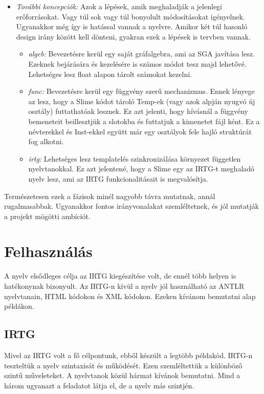 {\begin{itemize}
\item \emph{További koncepciók:}
Azok a lépések, amik meghaladják a jelenlegi erőforrásokat.
Vagy túl sok vagy túl bonyolult módosításokat igényelnek.
Ugyanakkor még így is hatással vannak a nyelvre.
Amikor két túl hasonló design irány között kell dönteni, gyakran ezek a lépések is tervben vannak.
\begin{itemize}
\item \emph{algeb:}
Bevezetésre kerül egy saját gráfalgebra, ami az SGA javítása lesz.
Ezeknek bejárására és kezelésére is számos módot tesz majd lehetővé.
Lehetséges lesz float alapon tárolt számokat kezelni.
\item \emph{func:}
Bevezetésre kerül egy függvény szerű mechanizmus.
Ennek lényege az lesz, hogy a Slime kódot tároló Temp-ek (vagy azok alpján nyugvó új osztály) futtathatóak lesznek.
Ez azt jelenti, hogy hívásnál a függvény bemeneteit beillesztjük a slotokba és futtatjuk a kimenetet fájl ként.
Ez a névterekkel és Inst-ekkel együtt már egy osztályok fele hajló struktúrát fog alkotni.
\item \emph{irtg:}
Lehetséges lesz templatelés szinkronizálása környezet független nyelvtanokkal.
Ez azt jelentené, hogy a Slime egy az IRTG-t meghaladó nyelv lesz, ami az IRTG funkcionalitásait is megvalósítja.
\end{itemize}

\end{itemize}

Természetesen ezek a fázisok minél nagyobb távra mutatnak, annál rugalmasabbak.
Ugyanakkor fontos irányvonalakat szemléltetnek, és jól mutatják a projekt mögötti ambíciót.



\section{Felhasználás}
A nyelv elsődleges célja az IRTG kiegészítése volt, de ennél több helyen is hatékonynak bizonyult.
Az IRTG-n kívül a nyelv jól használható az ANTLR nyelvtanain, HTML kódokon és XML kódokon.
Ezeken kívánom bemutatni alap példákon.


\subsection{IRTG}
Mivel az IRTG volt a fő célpontunk, ebből készült a legtöbb példakód.
IRTG-n teszteltük a nyelv szintaxisát és működését.
Ezen szemléltettük a különböző szintű műveleteket.
A nyelvtanok közül hármat kívánok bemutatni.
Mind a három ugyanazt a feladatot látja el, de a nyelv más szintjén.

}

